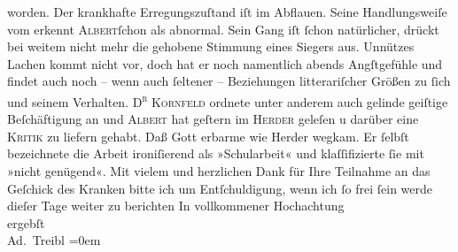 \begin{ledgroupsized}[t]{13cm}
               worden. Der krankhafte Erregungszuſtand iſt im Abflauen. Seine Handlungsweiſe vom
                  \label{K_L01575-1v}\label{K_L01575-1h} erkennt \textsc{Albert}ſchon als abnormal. Sein Gang iſt ſchon
               natürlicher, drückt bei weitem nicht mehr die gehobene Stimmung eines Siegers aus.
               Unnützes {\pb}Lachen kommt nicht vor, doch hat er noch
               namentlich abends Angſtgefühle und findet auch noch – wenn auch ſeltener –
               Beziehungen litterariſcher Größen zu ſich und seinem Verhalten.\pend
           \pstart
           \textsc{D\textsuperscript{r}}{ }\textsc{Kornfeld} ordnete unter anderem auch gelinde geiſtige Beſchäftigung an und \textsc{Albert} hat geſtern im \textsc{Herder} geleſen u darüber eine \textsc{Kritik} zu liefern gehabt. Daß
               Gott erbarme wie Herder wegkam. Er ſelbſt be{\pb}zeichnete die Arbeit ironiſierend als »Schularbeit«
               und klaſſifizierte ſie mit »nicht genügend«.\pend
           \pstart
           Mit vielem und herzlichen Dank für Ihre Teilnahme an das Geſchick des Kranken bitte ich um
               Entſchuldigung, wenn ich ſo frei ſein werde dieſer Tage weiter zu berichten \pend
           \pstart
           In vollkommener Hochachtung{\\[\baselineskip]}ergebſt{\\[\baselineskip]}\spacefill\mbox{Ad. Treibl}\pend
           \leftskip=0em{}
         
         \endnumbering{}\end{ledgroupsized}  \newcommand{\dateiname}{L01575}\newcommand{\titel}{Adolf Treibl an Arthur Schnitzler, [22.? 1. 1906]}\newcommand{\editorInnen}{Martin Anton Müller und Gerd-Hermann Susen}
      